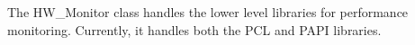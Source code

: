 %



The HW\_Monitor class handles the lower level libraries for
performance monitoring. Currently, it handles both the PCL
and PAPI libraries.
